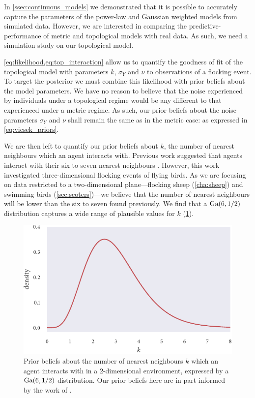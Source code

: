 In \cref{ssec:continuous_models} we demonstrated that it is possible to
accurately capture the parameters of the power-law and Gaussian weighted models
from simulated data. However, we are interested in comparing the
predictive-performance of metric and topological models with real data. As
such, we need a simulation study on our topological model.

\cref{eq:likelihood,eq:top_interaction} allow us to quantify the goodness of
fit of the topological model with parameters $k$, $\sigma_Y$ and $\nu$ to
observations of a flocking event. To target the posterior we must combine this
likelihood with prior beliefs about the model parameters. We have no reason to
believe that the noise experienced by individuals under a topological regime
would be any different to that experienced under a metric regime. As such, our
prior beliefs about the noise parameters $\sigma_Y$ and $\nu$ shall remain the
same as in the metric case: as expressed in \cref{eq:vicsek_priors}.

We are then left to quantify our prior beliefs about $k$, the number of nearest
neighbours which an agent interacts with. Previous work suggested that agents
interact with their six to seven nearest neighbours \parencite{ballerini08}.
However, this work investigated three-dimensional flocking events of flying
birds. As we are focusing on data restricted to a two-dimensional
plane---flocking sheep (\cref{cha:sheep}) and swimming birds
(\cref{sec:scoters})---we believe that the number of nearest neighbours will be
lower than the six to seven found previously. We find that a $\textrm{Ga}(6, 1/2)$
distribution captures a wide range of plausible values for $k$
(\cref{fig:top_priors}).

\begin{figure}[tbp]
  \includegraphics{top/top_priors.pdf}
  \caption{Prior beliefs about the number of nearest neighbours $k$ which an
  agent interacts with in a $2$-dimensional environment, expressed by a $\textrm{Ga}(6,
  1/2)$ distribution. Our prior beliefs here are in part informed by the work
  of \textcite{ballerini08}.}
  \label{fig:top_priors}
\end{figure}

